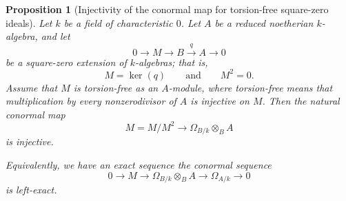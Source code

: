 \documentclass[11pt,twoside]{amsart}
\theoremstyle{plain}
\numberwithin{equation}{section}
\newtheorem{proposition}[theorem]{Proposition}
\theoremstyle{definition}
\begin{document}
\begin{proposition}[Injectivity of the conormal map for torsion-free square-zero ideals]
\label{prop:injectivity-conormal-map}
Let \(k\) be a field of characteristic \(0\). Let \(A\) be a reduced noetherian
\(k\)-algebra, and let
\[
    0\longrightarrow M\longrightarrow B\xrightarrow{q} A\longrightarrow 0
\]
be a square-zero extension of \(k\)-algebras; that is,
\[
    M=\ker(q)
    \qquad\text{and}\qquad
    M^2=0.
\]
Assume that \(M\) is torsion-free as an \(A\)-module, where torsion-free means that
multiplication by every nonzerodivisor of \(A\) is injective on \(M\). Then the natural
conormal map
\[
    M=M/M^2
    \longrightarrow
    \Omega_{B/k}\otimes_B A
\]
is injective.

Equivalently, we have an exact sequence the conormal sequence
\[
  0 \longrightarrow  M
    \longrightarrow
    \Omega_{B/k}\otimes_B A
    \longrightarrow
    \Omega_{A/k}
    \longrightarrow 0
\]
is left-exact.
\end{proposition}
\end{document}
